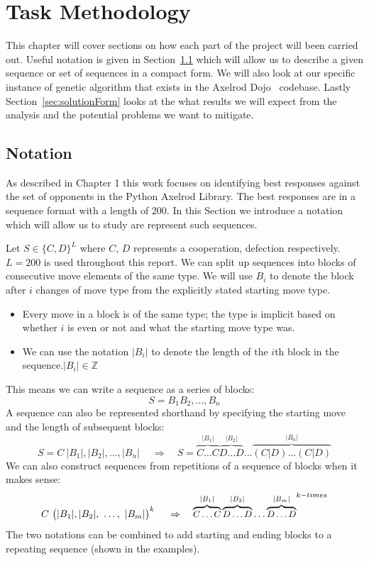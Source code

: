 
\chapter{Task Methodology}\label{ch:taskBackground}
This chapter will cover sections on how each part of the project will been carried out.
Useful notation is given in Section~\ref{sec:notation} which will allow us to describe a given sequence or set of sequences in a compact form.
We will also look at our specific instance of genetic algorithm that exists in the Axelrod Dojo~\cite{dojoV008} codebase.
Lastly Section~\ref{sec:solutionForm} looks at the what results we will expect from the analysis and the potential problems we want to mitigate.

\section{Notation}\label{sec:notation}
As described in Chapter 1 this work focuses on identifying best responses against the set of opponents in the Python Axelrod Library. The best responses are in a sequence format with a length of 200. In this Section we introduce a notation which will allow us to study are represent such sequences.

Let \(S\in\{C, D\}^L\) where \(C\), \(D\) represents a cooperation, defection respectively.
\(L=200\) is used throughout this report.
We can split up sequences into blocks of consecutive move elements of the same type.
We will use \(B_i\) to denote the block after \(i\) changes of move type from the explicitly stated starting move type.
\begin{itemize}
    \item Every move in a block is of the same type;
    the type is implicit based on whether \(i\) is even or not and what the starting move type was.
    \item We can use the notation \(|B_i|\) to denote the length of the \(i\)th block in the sequence.\(|B_i| \in \mathbb{Z}\)
\end{itemize}

This means we can write a sequence as a series of blocks:
\[S= B_1 B_2,\ldots,B_n\]
A sequence can also be represented shorthand by specifying the starting move and the length of subsequent blocks:
\[S = C\ |B_1|,|B_2|,\ldots,|B_n|\ \quad \Rightarrow \quad S=\overbrace{C\ldots C}^{|B_1|}\overbrace{D\ldots D}^{|B_2|}\ldots\overbrace{(C|D)\ldots (C|D)}^{|B_n|} \]
We can also construct sequences from repetitions of a sequence of blocks when it makes sense:
\[C\ \big{(}|B_1|,|B_2|,\ \ldots,\ |B_m|\big{)}^{k}\ \quad \Rightarrow \quad {\small{\overbrace{C\ldots C}^{|B_1|}\overbrace{D\ldots D}^{|B_2|}\ldots\overbrace{D\ldots D}^{|B_m|}}}^{k-times}\]
The two notations can be combined to add starting and ending blocks to a repeating sequence (shown in the examples).

